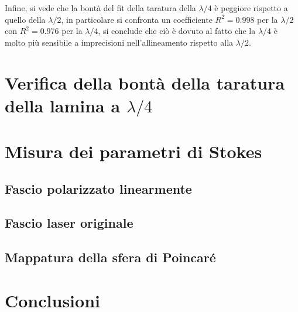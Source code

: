 \documentclass[10pt,oneside,a4paper]{article}
\begin{document}
\begin{multicols}{2}
Infine, si vede che la bontà del fit della taratura della $\lambda/4$ è peggiore rispetto a quello della $\lambda/2$, in particolare si confronta un coefficiente $R^2 = 0.998$ per la $\lambda/2$ con $R^2 = 0.976$ per la $\lambda/4$, si conclude che ciò è dovuto al fatto che la $\lambda/4$ è molto più sensibile a imprecisioni nell'allineamento rispetto alla $\lambda/2$.


\section{Verifica della bontà della taratura della lamina a $\lambda/4$}

\section{Misura dei parametri di Stokes}
\subsection{Fascio polarizzato linearmente} %
\subsection{Fascio laser originale}
\subsection{Mappatura della sfera di Poincaré}


\section{Conclusioni}


\end{multicols}
\end{document}
